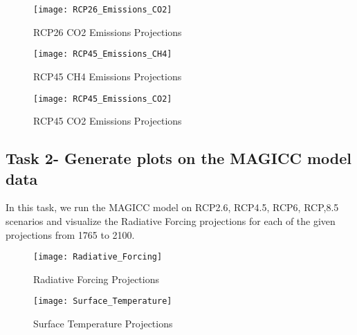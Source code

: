 \documentclass{article}
\begin{document}
\begin{figure}
    \texttt{[image: RCP26\_Emissions\_CO2]}
    \caption{RCP26 CO2 Emissions Projections}
\end{figure}

\begin{figure}
    \texttt{[image: RCP45\_Emissions\_CH4]}
    \caption{RCP45 CH4 Emissions Projections}
\end{figure}

\begin{figure}
    \texttt{[image: RCP45\_Emissions\_CO2]}
    \caption{RCP45 CO2 Emissions Projections}
\end{figure}

\clearpage
\subsection{Task 2- Generate plots on the MAGICC model data}
In this task, we run the MAGICC model on RCP2.6, RCP4.5, RCP6, RCP,8.5 scenarios and visualize the Radiative Forcing projections for each of the given projections from 1765 to 2100.
\begin{figure}[H]
\texttt{[image: Radiative\_Forcing]}
\caption{Radiative Forcing Projections}
\end{figure}

\begin{figure}[H]
\texttt{[image: Surface\_Temperature]}
\caption{Surface Temperature Projections}
\end{figure}
    



\end{document}
